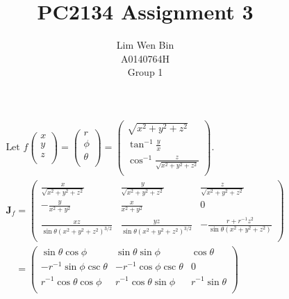 \documentclass[12pt]{article}
\newenvironment{problem}[2][Problem]{\begin{trivlist}
\item[\hskip \labelsep {\bfseries #1}\hskip \labelsep {\bfseries #2.}]}{\end{trivlist}}
\begin{document}
\title{PC2134 Assignment 3}
\author{Lim Wen Bin \\
A0140764H\\
Group 1}
\maketitle

\begin{problem}{1}
\end{problem}
\begin{gather*}
	\text{Let } f \left(\begin{array}{c}
		x\\
		y\\
		z\\
	\end{array}\right) = \left(\begin{array}{c}
		r\\
		\phi\\
		\theta\\
	\end{array}\right) = \left(\begin{array}{c}
		\sqrt{x^2 + y^2 + z^2}\\
		\tan^{-1}\frac{y}{x}\\
		\cos^{-1}\frac{z}{\sqrt{x^2 + y^2 + z^2}}\\
	\end{array}\right). \\
	\boldsymbol{J}_f = \left(\begin{array}{ccc}
		\frac{x}{\sqrt{x^2 + y^2 + z^2}} & \frac{y}{\sqrt{x^2 + y^2 + z^2}} &
			\frac{z}{\sqrt{x^2 + y^2 + z^2}}\\
		-\frac{y}{x^2 + y^2} & \frac{x}{x^2 + y^2} & 0\\
		\frac{xz}{\sin\theta(x^2 + y^2 + z^2)^{3/2}} & \frac{yz}{\sin\theta(x^2 +
			y^2 + z^2)^{3/2}} & -\frac{r+r^{-1}z^2}{\sin\theta(x^2 + y^2 + z^2)} \\
	\end{array}\right)\\
	\phantom{\boldsymbol{J}_f} = \left(\begin{array}{ccc}
		\sin\theta\cos\phi & \sin\theta\sin\phi & \cos\theta \\
		-r^{-1}\sin\phi\csc\theta & -r^{-1}\cos\phi\csc\theta & 0\\
		r^{-1}\cos\theta\cos\phi & r^{-1}\cos\theta\sin\phi & r^{-1}\sin\theta \\
	\end{array}\right)\\
	\begin{aligned}

\end{aligned}
\end{gather*}
\end{document}
